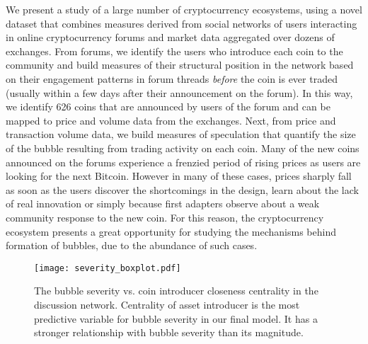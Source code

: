 We present a study of a large number of cryptocurrency ecosystems, 
using a novel dataset that combines measures derived from social networks of users interacting in online cryptocurrency forums and market data aggregated over dozens of exchanges.
From forums, we identify the users who introduce each coin to the community and build measures of their structural position in the network based on
their engagement patterns in forum threads \emph{before} the coin is ever traded (usually within a few days after their announcement on the forum).
In this way, we identify 626 coins that are announced by users of the forum and can be mapped to price and volume data from the exchanges.
Next, from price and transaction volume data, we build measures of speculation that quantify the size of the bubble resulting from trading activity on each coin. 
Many of the new coins announced on the forums experience a frenzied period of rising prices as users are looking for the next Bitcoin. However in many of these cases, prices sharply fall as soon as the users discover the shortcomings in the design, learn about the lack of real innovation or simply because first adapters observe about a weak community response to the new coin. For this reason, the cryptocurrency ecosystem presents a great opportunity for studying the mechanisms behind formation of bubbles, due to the abundance of such cases.



\begin{figure}
\centering
\texttt{[image: severity\_boxplot.pdf]}
\caption{The bubble severity vs. coin introducer closeness centrality in the discussion network. Centrality of asset introducer is the most predictive variable for bubble severity in our final model. It has a stronger relationship with bubble severity than its magnitude.}
\label{severity_boxplot}
\end{figure}

